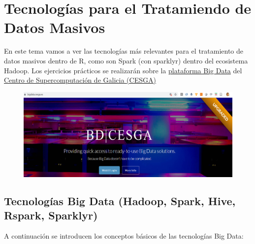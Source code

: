 \documentclass[]{book}
\begin{document}
\chapter{Tecnologías para el Tratamiendo de Datos
Masivos}\label{tecnologuxedas-para-el-tratamiendo-de-datos-masivos}

En este tema vamos a ver las tecnologías más relevantes para el
tratamiento de datos masivos dentro de R, como son Spark (con sparklyr)
dentro del ecosistema Hadoop. Los ejercicios prácticos se realizarán
sobre la \href{http://bigdata.cesga.es/}{plataforma Big Data} del
\href{http://www.cesga.es}{Centro de Supercomputación de Galicia
(CESGA)}

\begin{figure}
\centering
\includegraphics{images/T3-bigdatacesga.png}
\caption{}
\end{figure}

\section{Tecnologías Big Data (Hadoop, Spark, Hive, Rspark,
Sparklyr)}\label{tecnologuxedas-big-data-hadoop-spark-hive-rspark-sparklyr}

A continuación se introducen los conceptos básicos de las tecnologías
Big Data:
\end{document}
